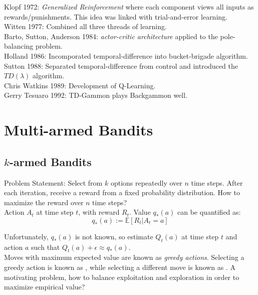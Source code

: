 \documentclass[a4paper]{article}
\begin{document}
Klopf 1972: \textit{Generalized Reinforcement} where each component views all inputs as rewards/punishments. This idea was linked with trial-and-error learning.\\

Witten 1977: Combined all three threads of learning.\\

Barto, Sutton, Anderson 1984: \textit{actor-critic architecture} applied to the pole-balancing problem.\\

Holland 1986: Incomporated temporal-difference into bucket-brigade algorithm.\\

Sutton 1988: Separated temporal-difference from control and introduced the $TD(\lambda)$ algorithm.\\

Chris Watkins 1989: Development of Q-Learning.\\

Gerry Tesuaro 1992: TD-Gammon plays Backgammon well.\\

\section{Multi-armed Bandits}
\subsection{$k$-armed Bandits}

Problem Statement: Select from $k$ options repeatedly over $n$ time steps. After each iteration, receive a reward from a fixed probability distribution. How to maximize the reward over $n$ time steps?\\

Action $A_t$ at time step $t$, with reward $R_t$. Value $q_*(a)$ can be quantified as: $$q_*(a) := \mathbb{E}[R_t | A_t = a]$$

Unfortunately, $q_*(a)$ is not known, so estimate $Q_t(a)$ at time step $t$ and action $a$ such that $Q_t(a) + \epsilon \approx q_*(a)$.\\

Moves with maximum expected value are known as \textit{greedy actions}. Selecting a greedy action is known as , while selecting a different move is known as . A motivating problem, how to balance exploitation and exploration in order to maximize empirical value?
\end{document}
